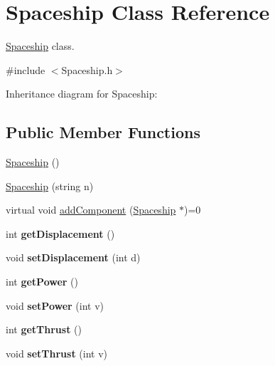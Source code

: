 \hypertarget{classSpaceship}{}\section{Spaceship Class Reference}
\label{classSpaceship}


\hyperlink{classSpaceship}{Spaceship} class.  




{\ttfamily \#include $<$Spaceship.\+h$>$}



Inheritance diagram for Spaceship\+:
\subsection*{Public Member Functions}
\begin{DoxyCompactItemize}
\item 
\hyperlink{classSpaceship_a13f1c8eb5ded2fb1687203322b22bca9}{Spaceship} ()
\item 
\hyperlink{classSpaceship_a27d48c8aff00407fd50f18522aa5164c}{Spaceship} (string n)
\item 
virtual void \hyperlink{classSpaceship_ac1b4673a691cd100708ddea08cd9f192}{add\+Component} (\hyperlink{classSpaceship}{Spaceship} $\ast$)=0
\item 
\mbox{\label{classSpaceship_a5c2741aa19fc4f38c1507b7c266fad1b}} 
int {\bfseries get\+Displacement} ()
\item 
\mbox{\label{classSpaceship_a689b09969d583d03adcb34073338395a}} 
void {\bfseries set\+Displacement} (int d)
\item 
\mbox{\label{classSpaceship_a4085ec55d3c13c8ba5f63bd8dee4573e}} 
int {\bfseries get\+Power} ()
\item 
\mbox{\label{classSpaceship_ae9697723e1b398c6531a0f48a3145c02}} 
void {\bfseries set\+Power} (int v)
\item 
\mbox{\label{classSpaceship_a080ecccde68594817833a3d62e7f63f0}} 
int {\bfseries get\+Thrust} ()
\item 
\mbox{\label{classSpaceship_a2983f2dc9719e86ac19bdcd12b368f1d}} 
void {\bfseries set\+Thrust} (int v)
\item 

\end{DoxyCompactItemize}
